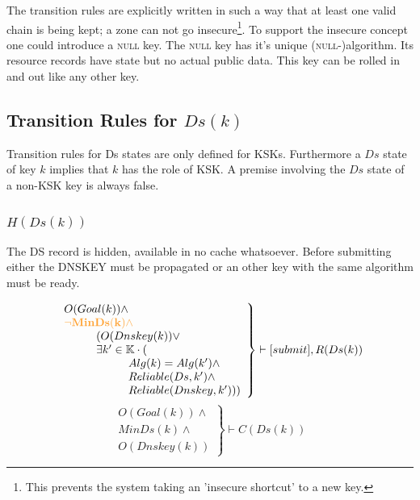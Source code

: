 \documentclass[twoside,english, a4paper]{article}
\newcommand{\highlightMinSig}[1]{\textcolor{MinSig}{\bf{#1}}}
\newcommand{\mathbox}[1]{#1}
\begin{document}
The transition rules are explicitly written in such a way that at 
least one valid chain is being kept; a zone can not go insecure\footnote{
This prevents the system taking an 'insecure shortcut' to a new key.}. To support the insecure concept one could introduce a 
\textsc{null} key. The \textsc{null} key has it's unique (\textsc 
{null}-)algorithm. Its resource records have state but no actual 
public data. This key can be rolled in and out like any other key.

\subsection{Transition Rules for $Ds(k)$}

Transition rules for Ds states are only defined for KSKs. Furthermore
a $Ds$ state of key $k$ implies that $k$ has the role of KSK. A premise 
involving the $Ds$ state of a non-KSK key is always false.

\subsubsection{$H(Ds(k))$}



\mathbox{
	
	The DS record is hidden, available in no cache whatsoever.
	Before submitting either the DNSKEY must be propagated or an other 
	key with the same algorithm must be ready.
	
	\begin{equation}
		\left.
		\begin{array}{l}
			O(Goal(k)) \wedge \\
\highlightMinSig{			\neg MinDs(k) \wedge }\\
\hskip 1cm		(O(Dnskey(k)) \vee \\
\hskip 1cm		\exists k' \in \mathbb{K} \cdot ( \\
\hskip 2cm			Alg(k)=Alg(k') \wedge \\
\hskip 2cm			Reliable(Ds, k') \wedge \\
\hskip 2cm			Reliable(Dnskey, k')))
		\end{array}
		\right\}\vdash [submit], R(Ds(k)) 
	\end{equation}
\highlightMinSig{
	\begin{equation}
		\left.
		\begin{array}{l}
			O(Goal(k)) \wedge \\
			MinDs(k) \wedge \\
			O(Dnskey(k))
		\end{array}
		\right\}\vdash C(Ds(k))
	\end{equation}
	}
}
\end{document}
